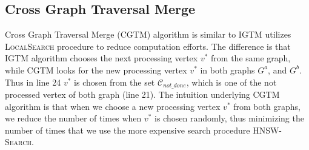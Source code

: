 \documentclass{article}
\begin{document}
\subsection{Cross Graph Traversal Merge}

Cross Graph Traversal Merge (\textsc{CGTM}) algorithm is similar to \textsc{IGTM} utilizes \textsc{LocalSearch} procedure to reduce computation efforts. The difference is that \textsc{IGTM} algorithm chooses the next processing vertex $v^*$ from the same graph, while \textsc{CGTM} looks for the new processing vertex $v^*$ in both graphs $G^a$, and $G^b$. 
Thus in line 24 $v^*$ is chosen from the set $\mathcal{C}_{not\_done}$, which is one of the not processed vertex of both graph (line 21). The intuition underlying \textsc{CGTM} algorithm is that when we choose a new processing vertex $v^*$ from both graphs, we reduce the number of times when $v^*$ is chosen randomly, thus minimizing the number of times that we use the more expensive search procedure \textsc{HNSW-Search}.
\end{document}
